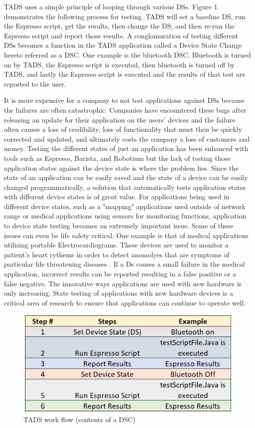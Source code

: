 TADS uses a simple principle of looping through various DSs.  Figure 1. demonstrates the following process for testing. TADS will set a baseline DS, run the Espresso script, get the results, then change the DS, and then re-run the Espresso script and report those results.  A conglomuration of testing different DSs becomes a function in the TADS application called a Device State Change hereto referred as a DSC.  One example is the bluetooth DSC.  Bluetooth is turned on by TADS, the Espresso script is executed, then bluetooth is turned off by TADS, and lastly the Espresso script is executed and the results of that test are reported to the user.

It is more expensive for a company to not test applications against DSs because the failures are often catastrophic.  Companies have encountered these bugs after releasing an update for their application on the users' devices and the failure often causes a loss of credibility, loss of functionality that must then be quickly corrected and updated, and ultimately costs the company a loss of customers and money.  Testing the different states of just an application has been enhanced with tools such as Espresso, Barista, and Robotium \cite{optimusinformationinc2016} but the lack of testing those application states against the device state is where the problem lies.  Since the state of an application can be easily saved and the state of a device can be easily changed programmatically, a solution that automatically tests application states with different device states is of great value.  For applications being used in different device states, such as a "mapping" applications used outside of network range or medical applications using sensors for monitoring functions, application to device state testing becomes an extremely important issue.  Some of these issues can even be life safety critical.  One example is that of medical applications utilizing portable Electrocardiograms.  These devices are used to monitor a patient's heart rythems in order to detect anomolyes that are symptoms of particular life threatening diseases \cite{boulos2014mobile}.  If a Ds causes a small failure in the medical application, incorrect results can be reported resulting in a false positive or a false negative.  The innovative ways applications are used with new hardware is only increasing.  State testing of applications with new hardware devices is a critical area of research to ensure that applications can continue to operate well. 
\begin{figure}[t]
	\centering
	\caption[TADS work flow]{TADS work flow (contents of a DSC)}
	\label{fig:table1}
	\includegraphics[width=1\linewidth]{table1}
\end{figure}
